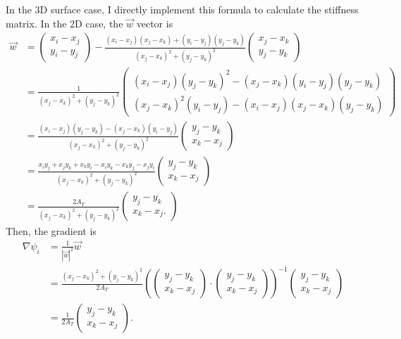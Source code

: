 In the 3D surface case, I directly implement this formula to calculate the stiffness matrix. In the 2D case, the $\vec{w}$ vector is
\begin{align*}
    \vec{w} &= \begin{pmatrix}
        x_i - x_j \\ y_i - y_j
    \end{pmatrix} - \frac{(x_i - x_j)(x_j - x_k) + (y_i - y_j)(y_j - y_k)}{(x_j - x_k)^2 + (y_j - y_k)^2} \begin{pmatrix}
        x_j - x_k \\ y_j - y_k
    \end{pmatrix} \\
    &= \frac{1}{(x_j - x_k)^2 + (y_j - y_k)^2} \begin{pmatrix}
        (x_i - x_j) (y_j - y_k)^2 - (x_j - x_k) (y_i - y_j) (y_j - y_k) \\
        (x_j - x_k)^2 (y_i - y_j) - (x_i - x_j)(x_j - x_k) (y_j - y_k)
    \end{pmatrix} \\
    &= \frac{(x_i - x_j)(y_j - y_k) - (x_j - x_k) (y_i - y_j)}{(x_j - x_k)^2 + (y_j - y_k)^2} \begin{pmatrix}
        y_j - y_k \\ x_k - x_j
    \end{pmatrix} \\
    &= \frac{x_i y_j + x_j y_k + x_k y_i - x_i y_k - x_k y_j - x_j y_i}{(x_j - x_k)^2 + (y_j - y_k)^2} \begin{pmatrix}
        y_j - y_k \\ x_k - x_j
    \end{pmatrix} \\
    &= \frac{2 A_T}{(x_j - x_k)^2 + (y_j - y_k)^2} \begin{pmatrix}
        y_j - y_k \\ x_k - x_j.
    \end{pmatrix}
\end{align*}
Then, the gradient is
\begin{align*}
    \nabla \psi_i &= \frac{1}{|\vec{w}|^2} \vec{w} \\
    &= \frac{(x_j - x_k)^2 + (y_j - y_k)^2}{2 A_T} \left(\begin{pmatrix}
        y_j - y_k \\ x_k - x_j
    \end{pmatrix} \cdot \begin{pmatrix}
        y_j - y_k \\ x_k - x_j
    \end{pmatrix}\right)^{-1} \begin{pmatrix}
        y_j - y_k \\ x_k - x_j
    \end{pmatrix} \\
    &= \frac{1}{2 A_T} \begin{pmatrix}
        y_j - y_k \\ x_k - x_j
    \end{pmatrix}.
\end{align*}


